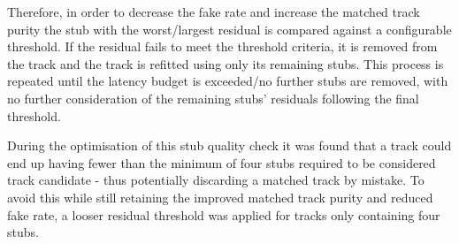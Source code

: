 Therefore, in order to decrease the fake rate and increase the matched track purity the stub with the worst/largest residual is compared against a configurable threshold.
If the residual fails to meet the threshold criteria, it is removed from the track and the track is refitted using only its remaining stubs.
This process is repeated until the latency budget is exceeded/no further stubs are removed, with no further consideration of the remaining stubs' residuals following the final threshold.

During the optimisation of this stub quality check it was found that a track could end up having fewer than the minimum of four stubs required to be considered track candidate - thus potentially discarding a matched track by mistake.
To avoid this while still retaining the improved matched track purity and reduced fake rate, a looser residual threshold was applied for tracks only containing four stubs.

\begin{table}[htbp]
\label{tab:chi2_iterations}
  \centering
\end{table}

